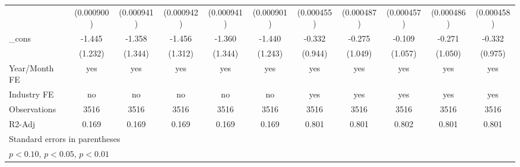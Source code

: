 \begin{table}[htbp]
\begin{tabular}{l*{10}{c}}
                &(0.000900)         &(0.000941)         &(0.000942)         &(0.000941)         &(0.000901)         &(0.000455)         &(0.000487)         &(0.000457)         &(0.000486)         &(0.000458)         \\
\_cons          &   -1.445         &   -1.358         &   -1.456         &   -1.360         &   -1.440         &   -0.332         &   -0.275         &   -0.109         &   -0.271         &   -0.332         \\
                &  (1.232)         &  (1.344)         &  (1.312)         &  (1.344)         &  (1.243)         &  (0.944)         &  (1.049)         &  (1.057)         &  (1.050)         &  (0.975)         \\
\hline
Year/Month FE   &      yes         &      yes         &      yes         &      yes         &      yes         &      yes         &      yes         &      yes         &      yes         &      yes         \\
Industry FE     &       no         &       no         &       no         &       no         &       no         &      yes         &      yes         &      yes         &      yes         &      yes         \\
Observations    &     3516         &     3516         &     3516         &     3516         &     3516         &     3516         &     3516         &     3516         &     3516         &     3516         \\
R2-Adj          &    0.169         &    0.169         &    0.169         &    0.169         &    0.169         &    0.801         &    0.801         &    0.802         &    0.801         &    0.801         \\
\hline\hline
\multicolumn{11}{l}{\footnotesize Standard errors in parentheses}\\
\multicolumn{11}{l}{\footnotesize \sym{*} \(p<0.10\), \sym{**} \(p<0.05\), \sym{***} \(p<0.01\)}\\
\end{tabular}
\end{table}
